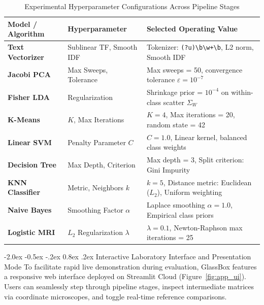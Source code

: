 \documentclass[12pt,a4paper]{report}
\makeatletter
\renewcommand\section{\@startsection {section}{1}{\z@}%
                                   {-2.0ex \@plus -0.5ex \@minus -.2ex}%
                                   {0.8ex \@plus.2ex}%
                                   {\normalfont\fontsize{14}{17}\bfseries\color{headerblue}}}
\makeatother
\begin{document}
\begin{table}[!ht]
\centering
\renewcommand{\arraystretch}{0.88}
\caption[Experimental Hyperparameters]{Experimental Hyperparameter Configurations Across Pipeline Stages}
\label{tab:hyperparams}
\small
\begin{tabular}{|l|l|p{7.0cm}|}
\hline
\textbf{Model / Algorithm} & \textbf{Hyperparameter} & \textbf{Selected Operating Value} \\ \hline
\textbf{Text Vectorizer} & Sublinear TF, Smooth IDF & Tokenizer: \texttt{(?u)\textbackslash b\textbackslash w+\textbackslash b}, L2 norm, Smooth IDF \\ \hline
\textbf{Jacobi PCA} & Max Sweeps, Tolerance & Max sweeps = 50, convergence tolerance $\varepsilon = 10^{-7}$ \\ \hline
\textbf{Fisher LDA} & Regularization & Shrinkage prior = $10^{-4}$ on within-class scatter $\Sigma_W$ \\ \hline
\textbf{K-Means} & $K$, Max Iterations & $K = 4$, Max iterations = 20, random state = 42 \\ \hline
\textbf{Linear SVM} & Penalty Parameter $C$ & $C = 1.0$, Linear kernel, balanced class weights \\ \hline
\textbf{Decision Tree} & Max Depth, Criterion & Max depth = 3, Split criterion: Gini Impurity \\ \hline
\textbf{KNN Classifier} & Metric, Neighbors $k$ & $k = 5$, Distance metric: Euclidean ($L_2$), Uniform weighting \\ \hline
\textbf{Naive Bayes} & Smoothing Factor $\alpha$ & Laplace smoothing $\alpha = 1.0$, Empirical class priors \\ \hline
\textbf{Logistic MRI} & $L_2$ Regularization $\lambda$ & $\lambda = 0.1$, Newton-Raphson max iterations = 25 \\ \hline
\end{tabular}
\end{table}

\section{Interactive Laboratory Interface and Presentation Mode}
\label{sec:ui_demo}
To facilitate rapid live demonstration during evaluation, GlassBox features a responsive web interface deployed on Streamlit Cloud (Figure~\ref{fig:app_ui}). Users can seamlessly step through pipeline stages, inspect intermediate matrices via coordinate microscopes, and toggle real-time reference comparisons.
\end{document}
